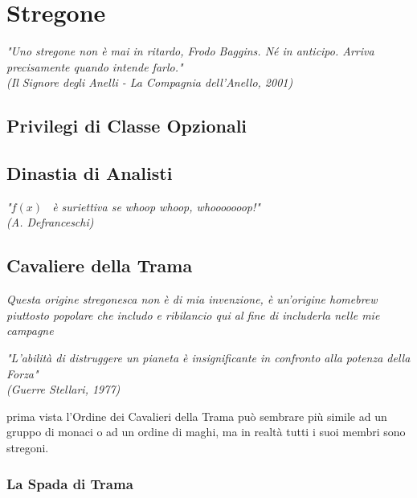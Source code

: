 \chapter{Stregone}

\begin{DndReadAloud}
    \it
    "Uno stregone non è mai in ritardo, Frodo Baggins. Né in anticipo. Arriva precisamente quando intende farlo." \\ (Il Signore degli Anelli - La Compagnia dell'Anello, 2001)
  \end{DndReadAloud}

\section{Privilegi di Classe Opzionali}

\section{Dinastia di Analisti}

\begin{DndReadAloud}
    \it
    "\begin{math}f(x)\end{math} \ è suriettiva se whoop whoop, whooooooop!" \\ (A. Defranceschi)
  \end{DndReadAloud}

\section{Cavaliere della Trama}
\textit{Questa origine stregonesca non è di mia invenzione, è un'origine homebrew piuttosto popolare che includo e ribilancio qui al fine di includerla nelle mie campagne}

\begin{DndReadAloud}
  \it
  "L'abilità di distruggere un pianeta è insignificante in confronto alla potenza della Forza" \\ (Guerre Stellari, 1977)
\end{DndReadAloud}

 prima vista l'Ordine dei Cavalieri della Trama può sembrare più simile ad un gruppo di monaci o ad un ordine di maghi, ma in realtà tutti i suoi membri sono stregoni.

\subsection{La Spada di Trama}

